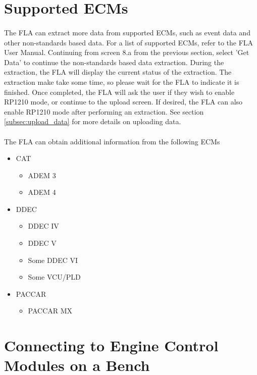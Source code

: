 \documentclass[11pt, oneside]{book}
\begin{document}
\section{Supported ECMs}
\paragraph{  }
The FLA can extract more data from supported ECMs, such as event data and other non-standards based data. For a list of supported ECMs, refer to the FLA User Manual. Continuing from screen 8.a from the previous section, select 'Get Data' to continue the non-standards based data extraction. During the extraction, the FLA will display the current status of the extraction. The extraction make take some time, so please wait for the FLA to indicate it is finished. Once completed, the FLA will ask the user if they wish to enable RP1210 mode, or continue to the upload screen. If desired, the FLA can also enable RP1210 mode after performing an extraction. See section \ref{subsec:upload_data} for more details on uploading data.
\paragraph{  }
The FLA can obtain additional information from the following ECMs
\begin{itemize}
\item CAT
\begin{itemize}
\item ADEM 3
\item ADEM 4
\end{itemize}
\item DDEC
\begin{itemize}
\item DDEC IV
\item DDEC V
\item Some DDEC VI
\item Some VCU/PLD
\end{itemize}
\item PACCAR
  \begin{itemize}
  \item{PACCAR MX}
  \end{itemize}
\end{itemize}

\section{Connecting to Engine Control Modules on a Bench}
\end{document}

